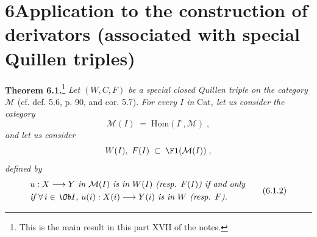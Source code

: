 

\section*{6\quad Application to the construction of derivators (associated with special Quillen triples)}

\textbf{Theorem 6.1.}\footnote[29]{This is the main result in this part XVII of the notes.} \textit{Let $(W,C,F)$ be a special closed Quillen triple on the category $\mathcal{M}$} (cf. def. 5.6, p. 90, and cor. 5.7). \textit{For every $I$ in} Cat\textit{, let us consider the category}
\[
\mathcal{M}(I) \;=\; \underline{\mathrm{Hom}}(I^{\circ},\mathcal{M}) \;, \tag*{(6.1.1)}
\]
\textit{and let us consider}
\[
W(I),\ F(I) \;\subset\; \Fl(\mathcal{M}(I)) \;,
\]
\textit{defined by}
\[
\begin{aligned}
&\text{\textit{$u : X \longrightarrow Y$ in $\mathcal{M}(I)$ is in $W(I)$ (resp. $F(I)$) if and only}}\\
&\text{\textit{if $\forall\, i \in \Ob I$, $u(i) : X(i) \longrightarrow Y(i)$ is in $W$ (resp. $F$).}}
\end{aligned}
\tag*{(6.1.2)}
\]

